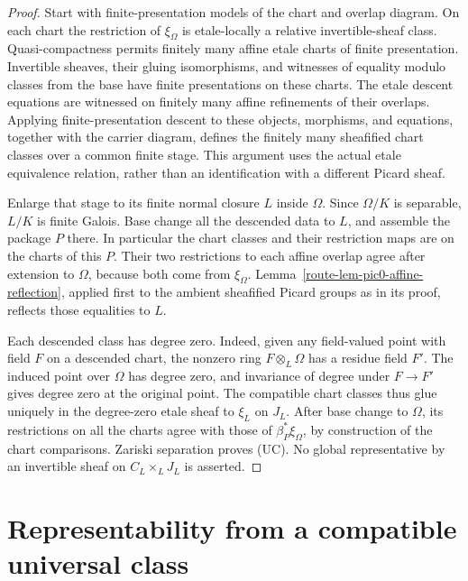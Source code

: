 \begin{proof}
  Start with finite-presentation models of the chart and overlap diagram.
  On each chart the restriction of \(\xi_\Omega\) is etale-locally a
  relative invertible-sheaf class.  Quasi-compactness permits finitely many
  affine etale charts of finite presentation.  Invertible sheaves, their
  gluing isomorphisms, and witnesses of equality modulo classes from the
  base have finite presentations on these charts.  The etale descent
  equations are witnessed on finitely many affine refinements of their
  overlaps.  Applying finite-presentation descent to these objects,
  morphisms, and equations, together with the carrier diagram, defines
  the finitely many sheafified chart classes over a common finite stage.
  This argument uses the actual etale equivalence relation, rather than
  an identification with a different Picard sheaf.

  Enlarge that stage to its finite normal closure \(L\) inside \(\Omega\).
  Since \(\Omega/K\) is separable, \(L/K\) is finite Galois.  Base change
  all the descended data to \(L\), and assemble the package \(P\) there.
  In particular the chart classes and their restriction maps are on
  the charts of this \(P\).  Their two restrictions to each affine
  overlap agree after extension to \(\Omega\), because both come from
  \(\xi_\Omega\).  Lemma~\ref{route-lem-pic0-affine-reflection}, applied
  first to the ambient sheafified Picard groups as in its proof, reflects
  those equalities to \(L\).

  Each descended class has degree zero.  Indeed, given any field-valued
  point with field \(F\) on a descended chart, the nonzero ring
  \(F\otimes_L\Omega\) has a residue field \(F'\).  The induced point
  over \(\Omega\) has degree zero, and invariance of degree under
  \(F\to F'\) gives degree zero at the original point.
  The compatible chart classes thus glue uniquely in the degree-zero
  etale sheaf to \(\xi_L\) on \(J_L\).  After base change to
  \(\Omega\), its restrictions on all the charts agree with those of
  \(\beta_P^*\xi_\Omega\), by construction of the chart comparisons.
  Zariski separation proves (UC).  No global representative by an
  invertible sheaf on \(C_L\times_L J_L\) is asserted.
\end{proof}

\section{Representability from a compatible universal class}

